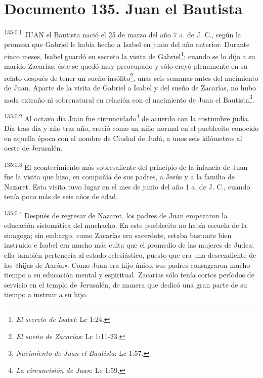 \chapter{Documento 135. Juan el Bautista}
\par 
\textsuperscript{135:0.1} JUAN el Bautista nació el 25 de marzo del año 7 a. de J. C., según la promesa que Gabriel le había hecho a Isabel en junio del año anterior. Durante cinco meses, Isabel guardó en secreto la visita de Gabriel\footnote{\textit{El secreto de Isabel}: Lc 1:24.}; cuando se lo dijo a su marido Zacarías, éste se quedó muy preocupado y sólo creyó plenamente en su relato después de tener un sueño insólito\footnote{\textit{El sueño de Zacarías}: Lc 1:11-23.}, unas seis semanas antes del nacimiento de Juan. Aparte de la visita de Gabriel a Isabel y del sueño de Zacarías, no hubo nada extraño ni sobrenatural en relación con el nacimiento de Juan el Bautista\footnote{\textit{Nacimiento de Juan el Bautista}: Lc 1:57.}.

\par 
\textsuperscript{135:0.2} Al octavo día Juan fue circuncidado\footnote{\textit{La circuncisión de Juan}: Lc 1:59.} de acuerdo con la costumbre judía. Día tras día y año tras año, creció como un niño normal en el pueblecito conocido en aquella época con el nombre de Ciudad de Judá, a unos seis kilómetros al oeste de Jerusalén.

\par 
\textsuperscript{135:0.3} El acontecimiento más sobresaliente del principio de la infancia de Juan fue la visita que hizo, en compañía de sus padres, a Jesús y a la familia de Nazaret. Esta visita tuvo lugar en el mes de junio del año 1 a. de J. C., cuando tenía poco más de seis años de edad.

\par 
\textsuperscript{135:0.4} Después de regresar de Nazaret, los padres de Juan empezaron la educación sistemática del muchacho. En este pueblecito no había escuela de la sinagoga; sin embargo, como Zacarías era sacerdote, estaba bastante bien instruido e Isabel era mucho más culta que el promedio de las mujeres de Judea; ella también pertenecía al estado eclesiástico, puesto que era una descendiente de las «hijas de Aarón». Como Juan era hijo único, sus padres consagraron mucho tiempo a su educación mental y espiritual. Zacarías sólo tenía cortos períodos de servicio en el templo de Jerusalén, de manera que dedicó una gran parte de su tiempo a instruir a su hijo.

